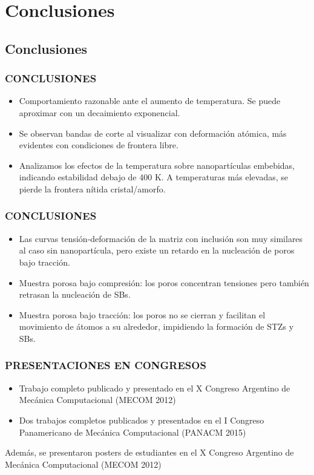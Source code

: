 
\section{Conclusiones}
\subsection{Conclusiones}

\begin{frame}
  \frametitle{CONCLUSIONES}
 \begin{itemize} 
  \item Comportamiento razonable ante el aumento de temperatura. Se puede aproximar con un decaimiento exponencial.
  \vspace{0.2cm}
  \item Se observan bandas de corte al visualizar con deformación atómica, más evidentes con condiciones de frontera libre.
  \vspace{0.2cm}
  \item Analizamos los efectos de la temperatura sobre nanopartículas embebidas, indicando estabilidad debajo de 400 K. A temperaturas más elevadas, se pierde la frontera nítida cristal/amorfo.
 \end{itemize}
\end{frame}

\begin{frame}
  \frametitle{CONCLUSIONES}
 \begin{itemize}
  \item Las curvas tensión-deformación de la matriz con inclusión son muy similares al caso sin nanopartícula, pero existe un retardo en la nucleación de poros bajo tracción.
  \vspace{0.2cm}
  \item Muestra porosa bajo compresión: los poros concentran tensiones pero también retrasan la nucleación de SBs.
  \vspace{0.2cm}
  \item Muestra porosa bajo tracción: los poros no se cierran y facilitan el movimiento de átomos a su alrededor, impidiendo la formación de STZs y SBs.
 \end{itemize}
\end{frame}

\begin{frame}
 \frametitle{PRESENTACIONES EN CONGRESOS}
 \begin{itemize}
  \item Trabajo completo publicado y presentado en el X Congreso Argentino de Mecánica Computacional (MECOM 2012)
  \vspace{0.2cm}
  \item Dos trabajos completos publicados y presentados en el I Congreso Panamericano de Mecánica Computacional (PANACM 2015)
 \end{itemize}
  \vspace{0.5cm}
  Además, se presentaron posters de estudiantes en el X Congreso Argentino de Mecánica Computacional (MECOM 2012) 
\end{frame}


